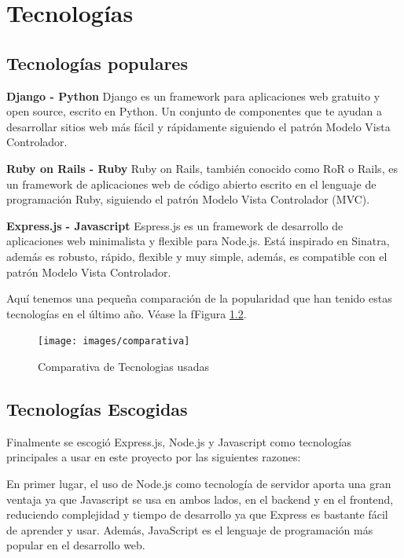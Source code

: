 
\section{Tecnologías}
\label{3:sec1}

\subsection{Tecnologías populares}
\label{3:1:1}
{\bf Django - Python}
Django es un framework para aplicaciones web gratuito y open source, escrito en Python. Un conjunto de componentes que te ayudan a desarrollar sitios web más fácil y rápidamente siguiendo el patrón Modelo Vista Controlador.

{\bf Ruby on Rails - Ruby}
Ruby on Rails, también conocido como RoR o Rails, es un framework de aplicaciones web de código abierto escrito en el lenguaje de programación Ruby, siguiendo el patrón Modelo Vista Controlador (MVC).

{\bf Express.js - Javascript}
Espress.js  es un framework de desarrollo de aplicaciones web minimalista y flexible para Node.js. Está inspirado en Sinatra, además es robusto, rápido, flexible y muy simple, además, es compatible con el patrón Modelo Vista Controlador.

Aquí tenemos una pequeña comparación de la popularidad que han tenido estas tecnologías en el último año. Véase la fFigura \ref{3:1:2}.


\begin{figure}[!th]
\begin{center}
\texttt{[image: images/comparativa]}
\caption{Comparativa de Tecnologias usadas}
\label{fig:Comparativa de Tecnologias usadas}
\end{center}
\end{figure}
\subsection{Tecnologías Escogidas}
\label{3:1:2}

Finalmente se escogió Express.js, Node.js y Javascript como tecnologías principales a usar en este proyecto por las siguientes razones:

En primer lugar, el uso de Node.js como tecnología de servidor aporta una gran ventaja ya que Javascript se usa en ambos lados, en el backend y en el frontend, reduciendo complejidad y tiempo de desarrollo ya que Express es bastante fácil de aprender y usar. Además, JavaScript es el lenguaje de programación más popular en el desarrollo web.

